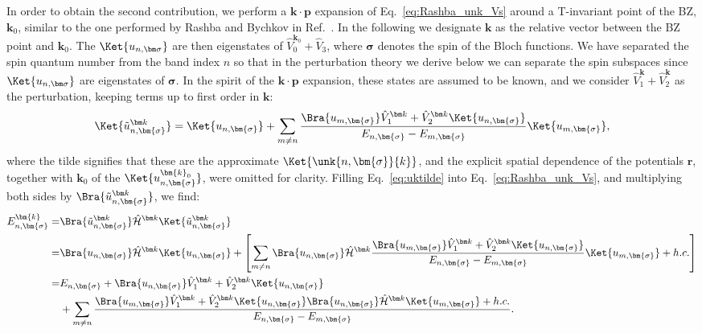 In order to obtain the second contribution, we perform a $\bm k \cdot \bm p$ expansion of Eq.~\eqref{eq:Rashba_unk_Vs} around a T-invariant point of the BZ, $\bm k_0$, similar to the one performed by Rashba and Bychkov in Ref.~\cite{Rashba1959SymmetryAr}. In the following we designate $\bm k$ as the relative vector between the BZ point and $\bm k_0$. 
The $\Ket{\unks{n}}$ are then eigenstates of $\hat{V}_0^{\bm k_0} + \hat{V}_3$, where $\bm{\sigma}$ denotes the spin of the Bloch functions.
We have separated the spin quantum number from the band index $n$ so that in the perturbation theory we derive below we can separate the spin subspaces since $\Ket{\unks{n}}$ are eigenstates of $\bm{\sigma}$.
In the spirit of the $\bm k \cdot \bm p$ expansion, these states are assumed to be known, and we consider $\hat{V}_1^{\bm{k}} + \hat{V}_2^{\bm{k}}$ as the perturbation, keeping terms up to first order in $\bm k$:
\renewcommand{\unks}[1]{u_{#1, \bm{\sigma}}}
\begin{equation}
	\label{eq:uktilde}
	\Ket{\tilde{u}_{n, \bm{\sigma}}^{\bm k}}= \Ket{\unks{n}} + \sum_{m \neq n} \frac{\Bra{\unks{m}} \hat{V}_1^{\bm k} + \hat{V}_2^{\bm k}\Ket{\unks{n}}}{E_{n,\bm{\sigma}}-E_{m,\bm{\sigma}}}\Ket{\unks{m}},
\end{equation}
where the tilde signifies that these are the approximate $\Ket{\unk{n,\bm{\sigma}}{k}}$, and the explicit spatial dependence of the potentials $\bm r$, together with $\bm k_0$ of the $\Ket{u_{n, \bm{\sigma}}^{\bm{k}_0}}$, were omitted for clarity. 
Filling Eq.~\eqref{eq:uktilde} into Eq.~\eqref{eq:Rashba_unk_Vs}, and multiplying both sides by $\Bra{\tilde{u}_{n, \bm{\sigma}}^{\bm k}}$, we find:
\newcommand{\Hcal}{\hat{\mathcal H}^{\bm k}}
\begin{align}
	\label{eq:kp_expansion}
	E_{n,\bm{\sigma}}^{\bm{k}} =& \Bra{\tilde{u}_{n, \bm{\sigma}}^{\bm k}} \Hcal \Ket{\tilde{u}_{n, \bm{\sigma}}^{\bm k}}\\
	=&\Bra{u_{n, \bm{\sigma}}} \Hcal \Ket{u_{n, \bm{\sigma}}} + \left[\sum_{m \neq n} \Bra{u_{n, \bm{\sigma}}} \Hcal \frac{\Bra{\unks{m}} \hat{V}_1^{\bm k} + \hat{V}_2^{\bm k}\Ket{\unks{n}}}{E_{n,\bm{\sigma}}-E_{m,\bm{\sigma}}}\Ket{\unks{m}} + h.c. \right] \nonumber\\
	=& E_{n, \bm{\sigma}} + \Bra{u_{n, \bm{\sigma}}}  \hat{V}_1^{\bm k} + \hat{V}_2^{\bm k} \Ket{u_{n, \bm{\sigma}}}\nonumber \\
	&+ \sum_{m \neq n} \frac{\Bra{\unks{m}} \hat{V}_1^{\bm k} + \hat{V}_2^{\bm k}\Ket{\unks{n}}\Bra{u_{n, \bm{\sigma}}} \Hcal\Ket{\unks{m}}+ h.c.}{E_{n,\bm{\sigma}}-E_{m,\bm{\sigma}}}.\nonumber
\end{align}
